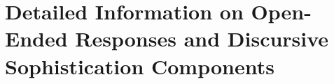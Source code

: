 



\clearpage
\section[Information on Discursive Sophistication Components]{Detailed Information on Open-Ended Responses and Discursive Sophistication Components}\label{app:oeinfo}

